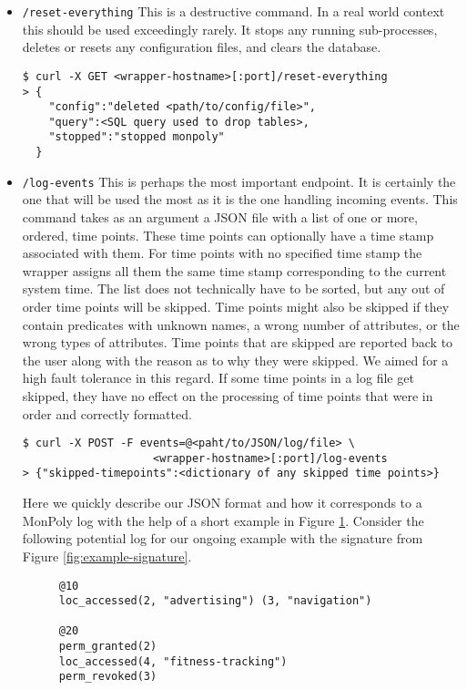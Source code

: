 \begin{itemize}
    \item \texttt{/reset-everything}
    This is a destructive command.
    In a real world context this should be used exceedingly rarely.
    It stops any running sub-processes, deletes or resets any configuration files, and clears the database.
    \begin{verbatim}
$ curl -X GET <wrapper-hostname>[:port]/reset-everything
> {
    "config":"deleted <path/to/config/file>",
    "query":<SQL query used to drop tables>,
    "stopped":"stopped monpoly"
  }
    \end{verbatim}
    \item \texttt{/log-events}
    This is perhaps the most important endpoint.
    It is certainly the one that will be used the most as it is the one handling incoming events.
    This command takes as an argument a JSON file with a list of one or more, ordered, time points.
    These time points can optionally have a time stamp associated with them.
    For time points with no specified time stamp the wrapper assigns all them the same time stamp corresponding to the current system time.
    The list does not technically have to be sorted, but any out of order time points will be skipped.
    Time points might also be skipped if they contain predicates with unknown names, a wrong number of attributes, or the wrong types of attributes.
    Time points that are skipped are reported back to the user along with the reason as to why they were skipped.
    We aimed for a high fault tolerance in this regard.
    If some time points in a log file get skipped, they have no effect on the processing of time points that were in order and correctly formatted.
    \begin{verbatim}
$ curl -X POST -F events=@<paht/to/JSON/log/file> \
                    <wrapper-hostname>[:port]/log-events        
> {"skipped-timepoints":<dictionary of any skipped time points>}
    \end{verbatim}
    Here we quickly describe our JSON format and how it corresponds to a MonPoly log with the help of a short example in Figure \ref{fig:example-log-monpoly}.
    Consider the following potential log for our ongoing example with the signature from Figure \ref{fig:example-signature}.
\begin{figure}
    \label{fig:example-log-monpoly}
\begin{verbatim}
@10
loc_accessed(2, "advertising") (3, "navigation")

@20
perm_granted(2)
loc_accessed(4, "fitness-tracking")
perm_revoked(3)


\end{verbatim}
\end{figure}
\end{itemize}
